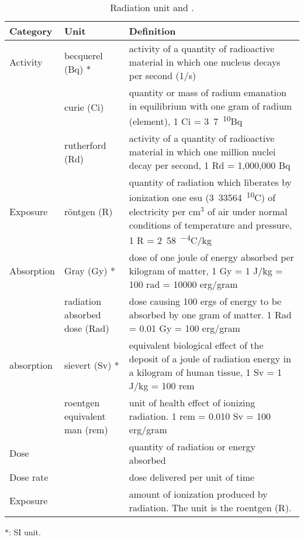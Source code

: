 \documentclass[molecules,review,submit,pdftex,moreauthors]{Definitions/mdpi}
\begin{document}
\begin{table}
\caption{Radiation unit and .} 
\centering
\begin{tabular}{p{1in}p{1.75in}p{2in}} \\
\toprule
 Category & Unit & Definition \\
\midrule
Activity & becquerel (Bq) * & activity of a quantity of radioactive material in which one nucleus decays per second (1/s) \\

& curie (Ci) & quantity or mass of radium emanation in equilibrium with one gram of radium (element), 1 Ci = \unit{3.7 \times 10^{10}}{Bq} \\

& rutherford (Rd) &  activity of a quantity of radioactive material in which one million nuclei decay per second, 1 Rd = 1,000,000 Bq \\

\midrule
Exposure & r\"{o}ntgen (R) & quantity of radiation which liberates by ionization one esu (\unit{3.33564 \times 10^{10}}{C}) of electricity per cm$^3$ of air under normal conditions of temperature and pressure, 1 R = \unit{2.58 \times 10^{-4}}{C/kg} \\

\midrule
Absorption & Gray (Gy) * & dose of one joule of energy absorbed per kilogram of matter, 1 Gy = 1 J/kg = 100 rad = 10000 erg/gram \\
& radiation absorbed dose (Rad) & dose causing 100 ergs of energy to be absorbed by one gram of matter. 1 Rad = 0.01 Gy = 100 erg/gram \\
\midrule
absorption & sievert (Sv) * & equivalent biological effect of the deposit of a joule of radiation energy in a kilogram of human tissue, 1 Sv = 1 J/kg = 100 rem \\

& roentgen equivalent man (rem) & 
unit of	health effect of ionizing radiation.  1 rem = 0.010 Sv = 100 erg/gram \\

\midrule

Dose & & quantity of radiation or energy absorbed \\
Dose rate & & dose delivered per unit of time \\
Exposure & & amount of ionization produced by radiation. The unit is the roentgen (R). \\
\bottomrule
\end{tabular} 

\begin{flushleft}
$*$: SI unit. %
 \\
\end{flushleft}

\label{Tab:RadiationUnit}
\end{table}
\end{document}
